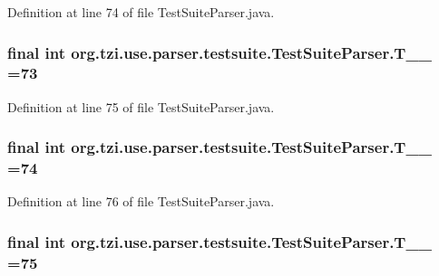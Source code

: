 Definition at line 74 of file Test\-Suite\-Parser.\-java.

\hypertarget{classorg_1_1tzi_1_1use_1_1parser_1_1testsuite_1_1_test_suite_parser_aa31c3a609aecae8d10aa46d130d83e5f}{
\subsubsection[{T\-\_\-\-\_\-73}]{\setlength{\rightskip}{0pt plus 5cm}final int org.\-tzi.\-use.\-parser.\-testsuite.\-Test\-Suite\-Parser.\-T\-\_\-\-\_ =73\hspace{0.3cm}{\ttfamily [static]}}}\label{classorg_1_1tzi_1_1use_1_1parser_1_1testsuite_1_1_test_suite_parser_aa31c3a609aecae8d10aa46d130d83e5f}


Definition at line 75 of file Test\-Suite\-Parser.\-java.

\hypertarget{classorg_1_1tzi_1_1use_1_1parser_1_1testsuite_1_1_test_suite_parser_a20739efd6107cea3699c42c7ee7f7c9f}{
\subsubsection[{T\-\_\-\-\_\-74}]{\setlength{\rightskip}{0pt plus 5cm}final int org.\-tzi.\-use.\-parser.\-testsuite.\-Test\-Suite\-Parser.\-T\-\_\-\-\_ =74\hspace{0.3cm}{\ttfamily [static]}}}\label{classorg_1_1tzi_1_1use_1_1parser_1_1testsuite_1_1_test_suite_parser_a20739efd6107cea3699c42c7ee7f7c9f}


Definition at line 76 of file Test\-Suite\-Parser.\-java.

\hypertarget{classorg_1_1tzi_1_1use_1_1parser_1_1testsuite_1_1_test_suite_parser_afeb2e206c72e7c088ccce50aa70483bc}{
\subsubsection[{T\-\_\-\-\_\-75}]{\setlength{\rightskip}{0pt plus 5cm}final int org.\-tzi.\-use.\-parser.\-testsuite.\-Test\-Suite\-Parser.\-T\-\_\-\-\_ =75\hspace{0.3cm}{\ttfamily [static]}}}\label{classorg_1_1tzi_1_1use_1_1parser_1_1testsuite_1_1_test_suite_parser_afeb2e206c72e7c088ccce50aa70483bc}


